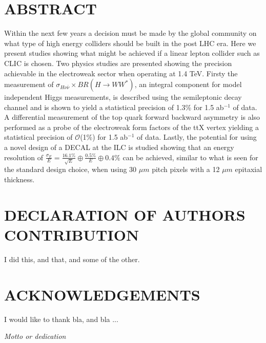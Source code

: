 \chapter*{ABSTRACT}
%
Within the next few years a decision must be made by the global community on what type of high energy colliders should be built in the post LHC era. Here we present studies showing what might be achieved if a linear lepton collider such as \ac{CLIC} is chosen. Two physics studies are presented showing the precision achievable in the electroweak sector when operating at 1.4 TeV. Firsty the measurement of $\sigma_{H\nu\bar{\nu}} \times BR(H\rightarrow WW^*)$, an integral component for model independent Higgs measurements, is described using the semileptonic decay channel and is shown to yield a statistical precision of 1.3\% for 1.5 ab$^{-1}$ of data. A differential measurement of the top quark forward backward asymmetry is also performed as a probe of the electroweak form factors of the ttX vertex yielding a statistical precision of $\mathcal{O}$(1\%) for 1.5 ab$^{-1}$ of data. Lastly, the potential for using a novel design of a \ac{DECAL} at the \ac{ILC} is studied showing that an energy resolution of $\frac{\sigma_E}{E}=\frac{16.1\%}{\sqrt{E}} \oplus \frac{0.5\%}{E} \oplus 0.4\%$ can be achieved, similar to what is seen for the standard design choice, when using 30 $\mu m$ pitch pixels with a 12 $\mu m$ epitaxial thickness.

%
\clearpage
\chapter*{DECLARATION OF AUTHORS CONTRIBUTION}
%
I did this, and that, and some of the other.
%
\clearpage
\chapter*{ACKNOWLEDGEMENTS}
%
I would like to thank bla, and bla ...
%
\cleardoublepage
~
\vspace*{\fill}
\begin{center}
  \emph{Motto or dedication}
\end{center}
\vspace*{\fill}
\cleardoublepage
